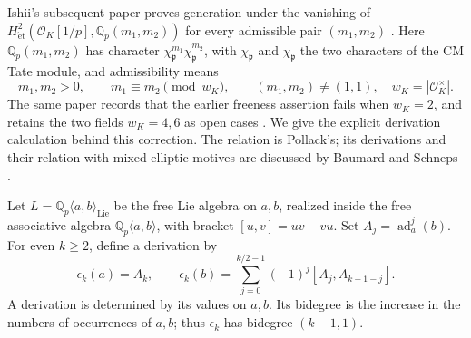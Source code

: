 \documentclass[11pt]{article}
\theoremstyle{definition}\newtheorem{definition}[theorem]{Definition}
\begin{document}
Ishii's subsequent paper proves generation under the vanishing of
\(H^2_{\mathrm{\acute et}}(\mathcal O_K[1/p],\mathbb Q_p(m_1,m_2))\)
for every admissible pair \((m_1,m_2)\)
\cite[Theorem 1.2, p.~3]{IshiiLie}. Here
\(\mathbb Q_p(m_1,m_2)\) has character
\(\chi_{\mathfrak p}^{m_1}\chi_{\bar{\mathfrak p}}^{m_2}\), with
\(\chi_{\mathfrak p}\) and \(\chi_{\bar{\mathfrak p}}\) the two
characters of the CM Tate module, and admissibility means
\[
 m_1,m_2>0,\qquad m_1\equiv m_2\pmod {w_K},\qquad
 (m_1,m_2)\ne(1,1),
 \quad w_K=|\mathcal O_K^\times|.
\]
The same paper records that the earlier freeness assertion fails
when \(w_K=2\), and retains the two fields \(w_K=4,6\) as open cases
\cite[Former Conjecture 1.8, p.~4, and Remark 1.9, p.~5]{IshiiLie}.
We give the explicit derivation calculation behind this correction.
The relation is Pollack's; its derivations and their relation with
mixed elliptic motives are discussed by Baumard and Schneps
\cite[pp.~2--3]{BaumardSchneps}.

Let \(L=\mathbb Q_p\langle a,b\rangle_{\mathrm{Lie}}\) be the free
Lie algebra on \(a,b\), realized inside the free associative algebra
\(\mathbb Q_p\langle a,b\rangle\), with bracket \([u,v]=uv-vu\).
Set \(A_j=\operatorname{ad}_a^j(b)\). For even \(k\geq2\), define
a derivation by
\[
 \epsilon_k(a)=A_k,\qquad
 \epsilon_k(b)=\sum_{j=0}^{k/2-1}(-1)^j[A_j,A_{k-1-j}].
\]
A derivation is determined by its values on \(a,b\). Its bidegree
is the increase in the numbers of occurrences of \(a,b\); thus
\(\epsilon_k\) has bidegree \((k-1,1)\).
\end{document}
